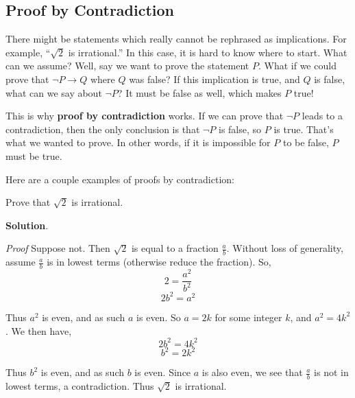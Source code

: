 \documentclass[11pt,]{book}
\makeatletter
\newcommand{\terminology}[1]{\textbf{#1}}
\theoremstyle{ptxplainnotitle}
\theoremstyle{ptxplaintitle}
\renewcommand*{\proofname}{Proof}
\renewenvironment{proof}[1][\proofname]{\par
  \pushQED{\qed}%
  \normalfont \topsep6\p@\@plus6\p@\relax
  \trivlist
  \item\relax
    {\itshape
    #1\@addpunct{.}}\hspace\labelsep\ignorespaces
}{%
  \popQED\endtrivlist\@endpefalse
}
\theoremstyle{ptxdefinitionnotitle}
\theoremstyle{ptxdefinitiontitle}
\theoremstyle{ptxdefinitionnotitle}
\theoremstyle{ptxdefinitiontitle}
\theoremstyle{ptxdefinitionnotitle}
\theoremstyle{ptxdefinitiontitle}
\theoremstyle{ptxdefinitiontitlenonumber}
\theoremstyle{ptxdefinitiontitlenonumber}
\numberwithin{equation}{chapter}
\newcommand{\imp}{\rightarrow}
\makeatother
\begin{document}
\subsection[{Proof by Contradiction}]{Proof by Contradiction}\label{subsection-24}
\hypertarget{p-2568}{}%
%
\par
\hypertarget{p-2569}{}%
There might be statements which really cannot be rephrased as implications. For example, ``\(\sqrt 2\) is irrational.'' In this case, it is hard to know where to start. What can we assume? Well, say we want to prove the statement \(P\). What if we could prove that \(\neg P \imp Q\) where \(Q\) was false? If this implication is true, and \(Q\) is false, what can we say about \(\neg P\)? It must be false as well, which makes \(P\) true!%
\par
\hypertarget{p-2570}{}%
This is why \terminology{proof by contradiction} works. If we can prove that \(\neg P\) leads to a contradiction, then the only conclusion is that \(\neg P\) is false, so \(P\) is true. That's what we wanted to prove. In other words, if it is impossible for \(P\) to be false, \(P\) must be true.%
\par
\hypertarget{p-2571}{}%
Here are a couple examples of proofs by contradiction:%
\begin{example}\label{example-68}
\hypertarget{p-2572}{}%
Prove that \(\sqrt{2}\) is irrational.%
\par\smallskip%
\noindent\textbf{Solution}.\hypertarget{solution-292}{}\quad%
\begin{proof}\hypertarget{proof-30}{}
\hypertarget{p-2573}{}%
Suppose not. Then \(\sqrt 2\) is equal to a fraction \(\frac{a}{b}\). Without loss of generality, assume \(\frac{a}{b}\) is in lowest terms (otherwise reduce the fraction). So,%
\begin{equation*}
2 = \frac{a^2}{b^2}
\end{equation*}
%
\begin{equation*}
2b^2 = a^2
\end{equation*}
%
\par
\hypertarget{p-2574}{}%
Thus \(a^2\) is even, and as such \(a\) is even. So \(a = 2k\) for some integer \(k\), and \(a^2 = 4k^2\). We then have,%
\begin{equation*}
2b^2 = 4k^2
\end{equation*}
%
\begin{equation*}
b^2 = 2k^2
\end{equation*}
%
\par
\hypertarget{p-2575}{}%
Thus \(b^2\) is even, and as such \(b\) is even. Since \(a\) is also even, we see that \(\frac{a}{b}\) is not in lowest terms, a contradiction. Thus \(\sqrt 2\) is irrational.%
\end{proof}
\end{example}
\end{document}
